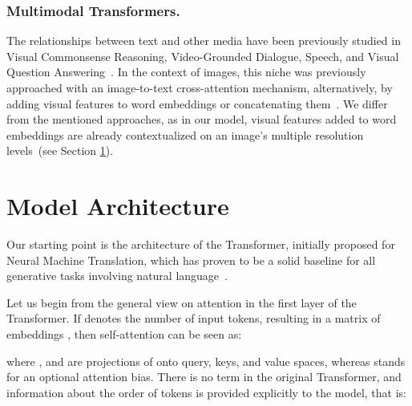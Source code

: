 \documentclass[runningheads]{llncs}
\begin{document}
\subsubsection{Multimodal Transformers.}
The relationships between text and other media have been previously studied in Visual Commonsense Reasoning, Video-Grounded Dialogue, Speech, and Visual Question Answering~\cite{han2021survey,le-etal-2019-multimodal,DBLP:journals/corr/abs-1910-11559}. In the context of images, this niche was previously approached with an image-to-text cross-attention mechanism, alternatively, by adding visual features to word embeddings or concatenating them~\cite{9037732,lee2018stacked,li2019visualbert,Su2020VL-BERT,xu2020layoutlm}. 
We differ from the mentioned approaches, as in our model, visual features added to word embeddings are already contextualized on an image's multiple resolution levels~(see Section \ref{sec:arch}). 


\section{Model Architecture}\label{sec:arch}
Our starting point is the architecture of the Transformer, initially proposed for Neural Machine Translation, which has proven to be a solid baseline for all generative tasks involving natural language~\cite{transformer}.

Let us begin from the general view on attention in the first layer of the Transformer.
If  denotes the number of input tokens, resulting in a matrix of embeddings , then self-attention can be seen as:

\noindent where ,  and  are projections of  onto query, keys, and value spaces, whereas  stands for an optional attention bias.
There is no  term in the original Transformer, and information about the order of tokens is provided explicitly to the model, that is:
\end{document}

